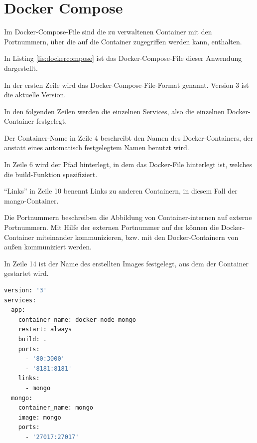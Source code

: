 \section{Docker Compose}\label{sec:Docker-Compose}
Im Docker-Compose-File sind die zu verwaltenen Container mit den Portnummern, über die auf die Container zugegriffen werden kann, enthalten.

In Listing \ref{lis:dockercompose} ist das Docker-Compose-File dieser Anwendung dargestellt.

In der ersten Zeile wird das Docker-Compose-File-Format genannt. Version 3 ist die aktuelle Version. 

In den folgenden Zeilen werden die einzelnen Services, also die einzelnen Docker-Container festgelegt.

Der Container-Name in Zeile 4 beschreibt den Namen des Docker-Containers, der anstatt eines automatisch festgelegtem Namen benutzt wird.

In Zeile 6 wird der Pfad hinterlegt, in dem das Docker-File hinterlegt ist, welches die build-Funktion spezifiziert. 

"`Links"' in Zeile 10 benennt Links zu anderen Containern, in diesem Fall der mango-Container.

Die Portnummern beschreiben die Abbildung von Container-internen auf externe Portnummern. Mit Hilfe der externen Portnummer auf der können die Docker-Container miteinander kommunizieren, bzw. mit den Docker-Containern von außen kommuniziert werden.

In Zeile 14 ist der Name des erstellten Images festgelegt, aus dem der Container gestartet wird.  

\cite{Docker.2019}

\begin{lstlisting}[language=bash, caption={docker-compose.yml-File}, label=lis:dockercompose]
version: '3'
services:
  app:
    container_name: docker-node-mongo
    restart: always
    build: .
    ports:
      - '80:3000'
      - '8181:8181'
    links:
      - mongo
  mongo:
    container_name: mongo
    image: mongo
    ports:
      - '27017:27017'


\end{lstlisting}


